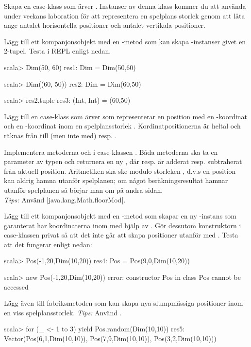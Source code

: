 \Subtask Skapa en case-klass  som ärver . Instanser av denna klass kommer du att använda under veckans laboration för att representera en spelplans storlek genom att låta  ange antalet horisontella positioner och  antalet vertikala positioner.

\Subtask Lägg till ett kompanjonsobjekt  med en -metod som kan skapa -instanser givet en 2-tupel.
Testa i REPL enligt nedan.
\begin{REPLnonum}
scala> Dim(50, 60)
res1: Dim = Dim(50,60)

scala> Dim((60, 50))
res2: Dim = Dim(60,50)

scala> res2.tuple
res3: (Int, Int) = (60,50)
\end{REPLnonum}

\Subtask Lägg till en case-klass  som ärver  som representerar en position med en -koordinat och en -koordinat inom en spelplansstorlek . Kordinatpositionerna är heltal och räknas från  till (men inte med)  resp. .

\Subtask Implementera metoderna \code{+} och \code{-} i case-klassen . Båda metoderna ska ta en parameter  av typen  och returnera en ny , där  resp.  är adderat resp. subtraherat från aktuell position. Aritmetiken ska ske modulo storleken , d.v.s en position kan aldrig hamna utanför spelplanen; om något beräkningsresultat hamnar utanför spelplanen så börjar man om på andra sidan. \\ \emph{Tips:} Använd  \code|java.lang.Math.floorMod|.

\Subtask Lägg till ett kompanjonsobjekt  med en -metod som skapar en ny -instans som garanterat har koordinaterna inom  med hjälp av . Gör dessutom konstruktorn i case-klassen  privat så att det inte går att skapa positioner utanför  med .
Testa att det fungerar enligt nedan:
\begin{REPLnonum}
scala> Pos(-1,20,Dim(10,20))
res4: Pos = Pos(9,0,Dim(10,20))

scala> new Pos(-1,20,Dim(10,20))
error: constructor Pos in class Pos cannot be accessed
\end{REPLnonum}

\Subtask Lägg även till fabriksmetoden  som kan skapa nya slumpmässiga positioner inom en viss spelplansstorlek. \emph{Tips:} Använd .
\begin{REPLnonum}
scala> for (_ <- 1 to 3) yield Pos.random(Dim(10,10))
res5: Vector(Pos(6,1,Dim(10,10)), Pos(7,9,Dim(10,10)), Pos(3,2,Dim(10,10)))
\end{REPLnonum}

